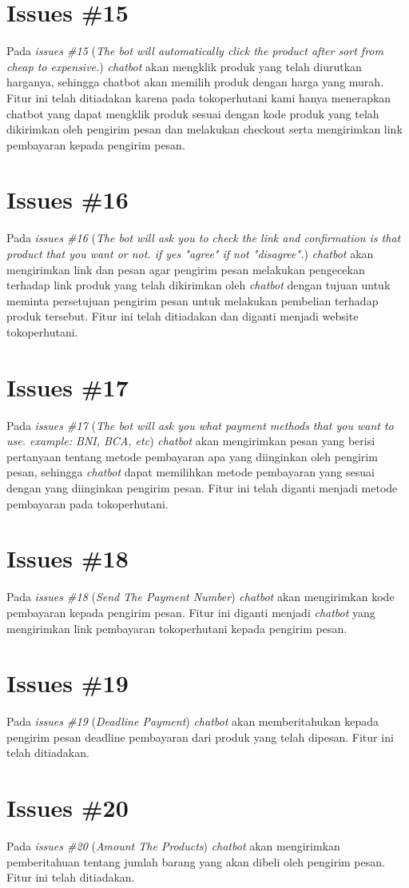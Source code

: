 \section{Issues \#15}
Pada \textit{issues \#15} (\textit{The bot will automatically click the product after sort from cheap to expensive.}) \textit{chatbot} akan mengklik produk yang telah diurutkan harganya, sehingga chatbot akan memilih produk dengan harga yang murah. Fitur ini telah ditiadakan karena pada tokoperhutani kami hanya menerapkan chatbot yang dapat mengklik produk sesuai dengan kode produk yang telah dikirimkan oleh pengirim pesan dan melakukan checkout serta mengirimkan link pembayaran kepada pengirim pesan.

\section{Issues \#16}
Pada \textit{issues \#16} (\textit{The bot will ask you to check the link and confirmation is that product that you want or not. if yes "agree" if not "disagree".}) \textit{chatbot} akan mengirimkan link dan pesan agar pengirim pesan melakukan pengecekan terhadap link produk yang telah dikirimkan oleh \textit{chatbot} dengan tujuan untuk meminta persetujuan pengirim pesan untuk melakukan pembelian terhadap produk tersebut. Fitur ini telah ditiadakan dan diganti menjadi website tokoperhutani.

\section{Issues \#17}
Pada \textit{issues \#17} (\textit{The bot will ask you what payment methods that you want to use. example: BNI, BCA, etc}) \textit{chatbot} akan mengirimkan pesan yang berisi pertanyaan tentang metode pembayaran apa yang diinginkan oleh pengirim pesan, sehingga \textit{chatbot} dapat memilihkan metode pembayaran yang sesuai dengan yang diinginkan pengirim pesan. Fitur ini telah diganti menjadi metode pembayaran pada tokoperhutani.

\section{Issues \#18}
Pada \textit{issues \#18} (\textit{Send The Payment Number}) \textit{chatbot} akan mengirimkan kode pembayaran kepada pengirim pesan. Fitur ini diganti menjadi \textit{chatbot} yang mengirimkan link pembayaran tokoperhutani kepada pengirim pesan.

\section{Issues \#19}
Pada \textit{issues \#19} (\textit{Deadline Payment}) \textit{chatbot} akan memberitahukan kepada pengirim pesan deadline pembayaran dari produk yang telah dipesan. Fitur ini telah ditiadakan.

\section{Issues \#20}
Pada \textit{issues \#20} (\textit{Amount The Products}) \textit{chatbot} akan mengirimkan pemberitahuan tentang jumlah barang yang akan dibeli oleh pengirim pesan. Fitur ini telah ditiadakan.